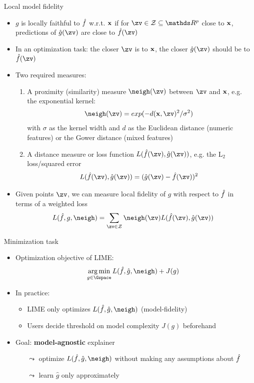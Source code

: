 \documentclass[10pt,compress,t,notes=noshow, xcolor=table]{beamer}
\newcommand{\gh}{\hat{g}}
\begin{document}
\begin{frame}{Local model fidelity}
 	\begin{itemize}
 		\item $g$ is locally faithful to $\hat{f}$ w.r.t. $\mathbf{x}$ 
 		if for $\zv \in \Zspace \subseteq \R^p$ close to $\mathbf{x}$, predictions of $\gh(\zv)$ are close to $\fh(\zv)$ 
 		\item In an optimization task: the closer $\zv$ is to $\mathbf{x}$, the closer $\gh(\zv)$ should be to $\fh(\zv)$  
 		\pause
 		\item Two required measures:
 		\begin{enumerate}
 			\item A proximity (similarity) measure $\neigh(\zv)$ between $\zv$ and $\mathbf{x}$, e.g. the exponential kernel:
 			$$\neigh(\zv) = exp(-d(\xv, \zv)^2/\sigma^2)$$ 
 			with $\sigma$ as the kernel width and $d$ as the Euclidean distance (numeric features) or the Gower distance (mixed features) 
 			\pause
 			\item A distance measure or loss function $L(\fh(\zv), \gh(\zv))$, e.g. the L$_2$ loss/squared error
 			$$L(\fh(\zv), \gh(\zv)) = (\gh(\zv) - \fh(\zv))^2$$ 
 		\end{enumerate}
 		\pause
 		\item Given points $\zv$, we can measure local fidelity of $g$ with respect to $\hat{f}$ in terms of a weighted loss
 		$$ L(\fh, g, \neigh) = \sum_{\zv \in \Zspace} \neigh(\zv) L(\fh(\zv), \gh(\zv)) $$
 	\end{itemize}
\end{frame}

\begin{frame}[c]{Minimization task}
	\begin{itemize}
		\item Optimization objective of LIME: 
		$$ \argmin_{g \in \Gspace} L(\fh, \gh, \neigh) + J(g)$$
		\item In practice:
		\begin{itemize}
		    \item LIME only optimizes $L(\fh, \gh, \neigh)$ (model-fidelity) 	
		    \item Users decide threshold on model complexity $J(g)$ beforehand
		\end{itemize}
		\item Goal: \textbf{model-agnostic} explainer
		\begin{itemize}
    		\item[$\leadsto$] optimize $L(\fh, \gh, \neigh)$ without making any assumptions about $\hat{f}$ 
    		\item[$\leadsto$] learn $\gh$ only approximately  
		\end{itemize}
		\end{itemize}
\end{frame} 
\end{document}
